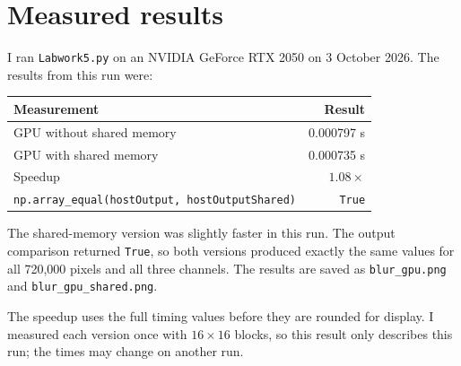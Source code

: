 \documentclass[11pt,a4paper]{article}
\begin{document}
\section{Measured results}
I ran \texttt{Labwork5.py} on an NVIDIA GeForce RTX 2050 on
3 October 2026. The results from this run were:
\begin{center}
\begin{tabular}{lr}
\toprule
Measurement & Result \\
\midrule
GPU without shared memory & 0.000797 s \\
GPU with shared memory & 0.000735 s \\
Speedup & $1.08\times$ \\
\texttt{np.array\_equal(hostOutput, hostOutputShared)} & \texttt{True} \\
\bottomrule
\end{tabular}
\end{center}

The shared-memory version was slightly faster in this run.
The output comparison returned \texttt{True}, so both versions produced
exactly the same values for all 720,000 pixels and all three channels.
The results are saved as \texttt{blur\_gpu.png} and
\texttt{blur\_gpu\_shared.png}.

The speedup uses the full timing values before they are rounded for
display. I measured each version once with $16\times16$ blocks, so this
result only describes this run; the times may change on another run.
\end{document}

